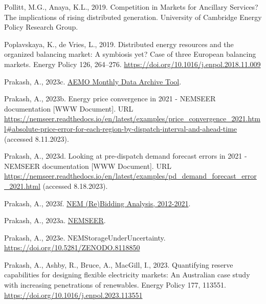 \documentclass[12pt,a4paper,]{report}
\newlength{\cslhangindent}
\newenvironment{CSLReferences}[2] %
 {%
  \setlength{\parindent}{0pt}
  \ifodd #1 \everypar{\setlength{\hangindent}{\cslhangindent}}\ignorespaces\fi
  \ifnum #2 > 0
  \setlength{\parskip}{#2\baselineskip}
  \fi
 }%
 {}
\begin{document}
\begin{CSLReferences}{1}{0}
\leavevmode{}%
Pollitt, M.G., Anaya, K.L., 2019. Competition in {Markets} for
{Ancillary Services}? {The} implications of rising distributed
generation. {University of Cambridge Energy Policy Research Group}.

\leavevmode{}%
Poplavskaya, K., de Vries, L., 2019. Distributed energy resources and
the organized balancing market: {A} symbiosis yet? {Case} of three
{European} balancing markets. Energy Policy 126, 264--276.
\url{https://doi.org/10.1016/j.enpol.2018.11.009}

\leavevmode{}%
Prakash, A., 2023c.
\href{https://github.com/prakaa/mms-monthly-cli}{{AEMO Monthly Data
Archive Tool}}.

\leavevmode{}%
Prakash, A., 2023b. Energy price convergence in 2021 - {NEMSEER}
documentation {[}WWW Document{]}. URL
\url{https://nemseer.readthedocs.io/en/latest/examples/price_convergence_2021.html\#absolute-price-error-for-each-region-by-dispatch-interval-and-ahead-time}
(accessed 8.11.2023).

\leavevmode{}%
Prakash, A., 2023d. Looking at pre-dispatch demand forecast errors in
2021 - {NEMSEER} documentation {[}WWW Document{]}. URL
\url{https://nemseer.readthedocs.io/en/latest/examples/pd_demand_forecast_error_2021.html}
(accessed 8.18.2023).

\leavevmode{}%
Prakash, A., 2023f.
\href{https://github.com/prakaa/nem-rebidding-analysis-2012-2021}{{NEM}
({Re}){Bidding Analysis}, 2012-2021}.

\leavevmode{}%
Prakash, A., 2023a.
\href{https://doi.org/10.5281/zenodo.7397514}{{NEMSEER}}.

\leavevmode{}%
Prakash, A., 2023e. {NEMStorageUnderUncertainty}.
\url{https://doi.org/10.5281/ZENODO.8118850}

\leavevmode{}%
Prakash, A., Ashby, R., Bruce, A., MacGill, I., 2023. Quantifying
reserve capabilities for designing flexible electricity markets: {An
Australian} case study with increasing penetrations of renewables.
Energy Policy 177, 113551.
\url{https://doi.org/10.1016/j.enpol.2023.113551}


\end{CSLReferences}
\end{document}
